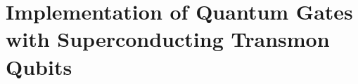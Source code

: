 \chapter{Implementation of Quantum Gates with Superconducting Transmon Qubits}
\label{chap:tmintro}
